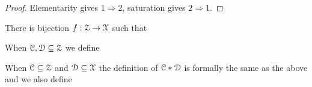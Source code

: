 \begin{proof}
  Elementarity gives 1$\Rightarrow$2, saturation gives $2\Rightarrow$1.
\end{proof}

\begin{fact}
  There is bijection $f:\EuScript Z\to\EuScript X$ such that 
\end{fact}

When $\EuScript C,\EuScript D\subseteq\EuScript Z$ we define


When $\EuScript C\subseteq\EuScript Z$ and $\EuScript D\subseteq\EuScript X$ the definition of $\EuScript C*\EuScript D$ is formally the same as the above and we also define




